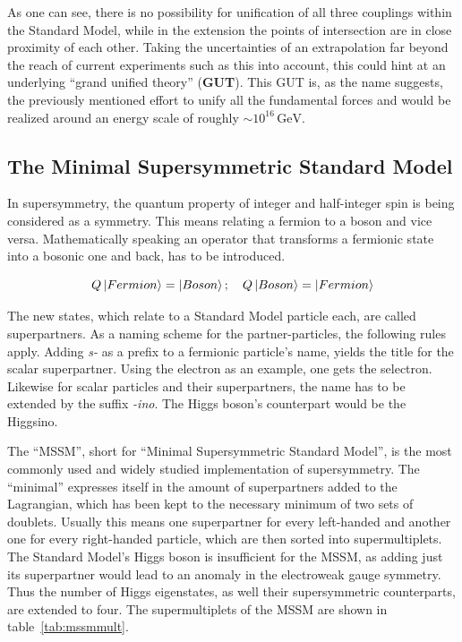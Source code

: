 As one can see, there is no possibility for unification of all three couplings within the Standard Model, while in the extension the points of intersection are in close proximity of each other. Taking the uncertainties of an extrapolation far beyond the reach of current experiments such as this into account, this could hint at an underlying ``grand unified theory'' (\textbf{GUT}). This GUT is, as the name suggests, the previously mentioned effort to unify all the fundamental forces and would be realized around an energy scale of roughly $\sim 10^{16}\,\text{GeV}$.



\subsection{The Minimal Supersymmetric Standard Model}

In supersymmetry, the quantum property of integer and half-integer spin is being considered as a symmetry. This means relating a fermion to a boson and vice versa. Mathematically speaking an operator that transforms a fermionic state into a bosonic one and back, has to be introduced.

\begin{equation}
  \label{eq:fermiboso}
  Q \Ket{Fermion} = \Ket{Boson}; \quad Q \Ket{Boson} = \Ket{Fermion}
\end{equation}

The new states, which relate to a Standard Model particle each, are called superpartners. As a naming scheme for the partner-particles, the following rules apply. Adding \textit{s-} as a prefix to a fermionic particle's name, yields the title for the scalar superpartner. Using the electron as an example, one gets the selectron. Likewise for scalar particles and their superpartners, the name has to be extended by the suffix \textit{-ino}. The Higgs boson's counterpart would be the Higgsino.

The ``MSSM'', short for ``Minimal Supersymmetric Standard Model'', is the most commonly used and widely studied implementation of supersymmetry. The ``minimal'' expresses itself in the amount of superpartners added to the Lagrangian, which has been kept to the necessary minimum of two sets of doublets. Usually this means one superpartner for every left-handed and another one for every right-handed particle, which are then sorted into supermultiplets. The Standard Model's Higgs boson is insufficient for the MSSM, as adding just its superpartner would lead to an anomaly in the electroweak gauge symmetry. Thus the number of Higgs eigenstates, as well their supersymmetric counterparts, are extended to four. The supermultiplets of the MSSM are shown in table~\ref{tab:mssmmult}.

